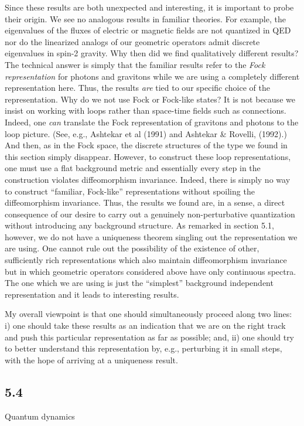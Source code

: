 Since these results are both unexpected and interesting, it is important to
probe their origin. We see no analogous results in familiar theories. For
example, the eigenvalues of the fluxes of electric or magnetic fields are
not quantized in QED nor do the linearized analogs of our geometric operators
admit discrete eigenvalues in spin-2 gravity. Why then did we find
qualitatively different results? The technical answer is simply that the
familiar results refer to the {\it Fock representation} for photons and
gravitons while we are using a completely different representation here. Thus,
the results {\it are} tied to our specific choice of the representation. Why
do we not use Fock or Fock-like states? It is not because we insist on working
with loops rather than space-time fields such as connections. Indeed, one {\it
can} translate the Fock representation of gravitons and photons to the loop
picture. (See, e.g., Ashtekar et al (1991) and Ashtekar \& Rovelli, (1992).)
And then, as in the Fock space, the discrete structures of the type we found
in this section simply disappear. However, to construct these loop
representations, one must use a flat background metric and essentially every
step in the construction violates diffeomorphism invariance. Indeed, there is
simply no way to construct ``familiar, Fock-like'' representations without
spoiling the diffeomorphism invariance. Thus, the results we found are,
in a sense, a direct consequence of our desire to carry out a genuinely
non-perturbative quantization without introducing any background structure.
As remarked in section 5.1, however, we do not have a uniqueness theorem
singling out the representation we are using. One cannot rule out the
possibility of the existence of other, sufficiently rich representations
which also maintain diffeomorphism invariance but in which geometric
operators considered above have only continuous spectra. The one which we
are using is just the ``simplest'' background independent representation
and it leads to interesting results.

My overall viewpoint is that one should simultaneously proceed along two
lines: i) one should take these results as an indication that we are on the
right track and push this particular representation as far as possible; and,
ii) one should try to better understand this representation by, e.g.,
perturbing it in small steps, with the hope of arriving at a uniqueness result.

\goodbreak
\subsection{5.4}{Quantum dynamics}%

